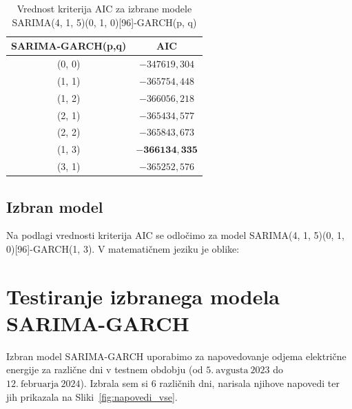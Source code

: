 \documentclass[a4paper, 11pt]{article}
\begin{document}
\begin{table}[!ht]
    \centering
    \caption{Vrednost kriterija AIC za izbrane modele SARIMA(4, 1, 5)(0, 1, 0)[96]-GARCH(p, q)}\par\medskip
    \label{Tab:GARCH_AIC}
    \begin{tabular}{c|c}
        SARIMA-GARCH(p,q) & AIC \\ \hline
        (0, 0) & $-347619{,}304$ \\ 
        (1, 1) & $-365754{,}448$ \\ 
        (1, 2) & $-366056{,}218$ \\ 
        (2, 1) & $-365434{,}577$ \\ 
        (2, 2) & $-365843{,}673$ \\ 
        (1, 3) & $\mathbf{-366134{,}335}$ \\ 
        (3, 1) & $-365252{,}576$ \\ 
    \end{tabular}
\end{table}



\subsection{Izbran model}

Na podlagi vrednosti kriterija AIC se odločimo za model SARIMA(4, 1, 5)(0, 1, 0)[96]-GARCH(1, 3). 
V matematičnem jeziku je oblike:



\pagebreak

\section{Testiranje izbranega modela SARIMA-GARCH}

Izbran model SARIMA-GARCH uporabimo za napovedovanje odjema električne energije za različne dni v testnem obdobju
(od $5.~\text{avgusta}~2023$ do $12.~\text{februarja}~2024$). Izbrala sem si $6$ različnih dni, narisala njihove napovedi ter
jih prikazala na Sliki~\ref{fig:napovedi_vse}.
\end{document}
